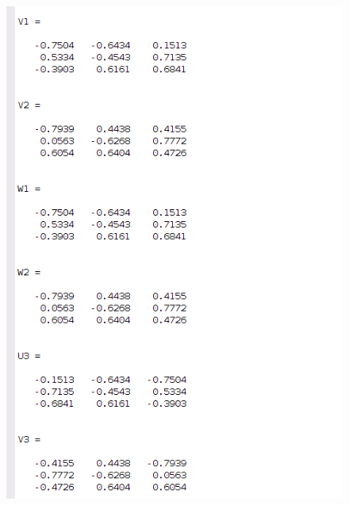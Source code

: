 \documentclass{article}
\begin{document}
\begin{figure}[H]

\includegraphics[scale = .5]{report3_1}
\end{figure}
\end{document}
